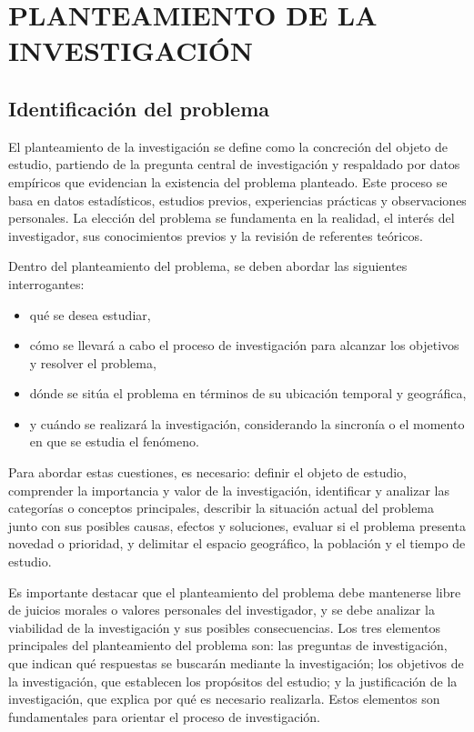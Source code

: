 \documentclass[12pt,a4paper,oneside]{report}
\begin{document}
\chapter{PLANTEAMIENTO DE LA INVESTIGACIÓN}

\section{Identificación del problema}

El planteamiento de la investigación se define como la concreción del objeto de estudio, partiendo de la pregunta central de investigación y respaldado por datos empíricos que evidencian la existencia del problema planteado. Este proceso se basa en datos estadísticos, estudios previos, experiencias prácticas y observaciones personales. La elección del problema se fundamenta en la realidad, el interés del investigador, sus conocimientos previos y la revisión de referentes teóricos.

Dentro del planteamiento del problema, se deben abordar las siguientes interrogantes:\\
\begin{itemize}
    \item qué se desea estudiar,
    \item cómo se llevará a cabo el proceso de investigación para alcanzar los objetivos y resolver el problema,
    \item  dónde se sitúa el problema en términos de su ubicación temporal y geográfica,
    \item y cuándo se realizará la investigación, considerando la sincronía o el momento en que se estudia el fenómeno.
\end{itemize} 

Para abordar estas cuestiones, es necesario: definir el objeto de estudio, comprender la importancia y valor de la investigación, identificar y analizar las categorías o conceptos principales, describir la situación actual del problema junto con sus posibles causas, efectos y soluciones, evaluar si el problema presenta novedad o prioridad, y delimitar el espacio geográfico, la población y el tiempo de estudio.

Es importante destacar que el planteamiento del problema debe mantenerse libre de juicios morales o valores personales del investigador, y se debe analizar la viabilidad de la investigación y sus posibles consecuencias. Los tres elementos principales del planteamiento del problema son: las preguntas de investigación, que indican qué respuestas se buscarán mediante la investigación; los objetivos de la investigación, que establecen los propósitos del estudio; y la justificación de la investigación, que explica por qué es necesario realizarla. Estos elementos son fundamentales para orientar el proceso de investigación.
\end{document}
